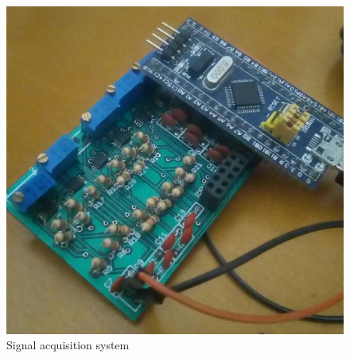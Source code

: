 \begin{figure}[!htpb]
\centering
\caption{Signal acquisition system}
\label{HW-pcb}
\includegraphics[scale=0.3]{images/INA/Hw-pcb}
\end{figure}

